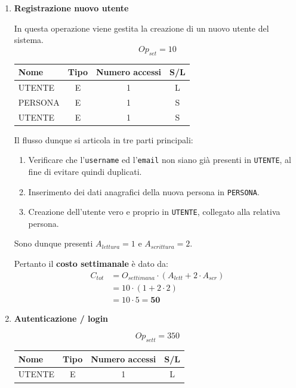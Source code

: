 \documentclass[a4paper,12pt]{report}
\begin{document}
\begin{enumerate}
	\item {\large \textbf{Registrazione nuovo utente}} \label{op1}
	
	In questa operazione viene gestita la creazione di un nuovo utente del sistema.
	$$
	{Op}_{set} = 10
	$$
	\begin{table}[H]
    \centering
    \small
    \renewcommand{\arraystretch}{1.15}
    \begin{tabularx}{0.8\textwidth}{|X|c|c|c|}
        \hline
        \rowcolor{gray!20}
        \textbf{Nome} & \textbf{Tipo} & \textbf{Numero accessi} & \textbf{S/L} \\
        \hline
        UTENTE & E & 1 & L \\
        \hline
        PERSONA & E & 1 & S \\
        \hline
        UTENTE & E & 1 & S \\
        \hline
    \end{tabularx}
	\end{table}

	Il flusso dunque si articola in tre parti principali:
	\begin{enumerate}
	\item Verificare che l'\texttt{username} ed l'\texttt{email} non siano già presenti in \texttt{UTENTE}, al fine di evitare quindi duplicati.
	\item Inserimento dei dati anagrafici della nuova persona in \texttt{PERSONA}.
	\item Creazione dell'utente vero e proprio in \texttt{UTENTE}, collegato alla relativa persona.
	\end{enumerate}

	Sono dunque presenti $A_{lettura}=1$ e $A_{scrittura}=2$.
	
	Pertanto il \textbf{costo settimanale} è dato da:
	\begin{align*}
	C_{tot} &= O_{settimana} \cdot (A_{lett} + 2 \cdot A_{scr}) \\
			&= 10 \cdot (1 + 2 \cdot 2) \\
			&= 10 \cdot 5 = \mathbf{50}
	\end{align*}
	

	\item {\large \textbf{Autenticazione / login}} \label{op2}
    
    $$
	{Op}_{sett} = 350
	$$
    
	\begin{table}[H]
    \centering
    \small
    \renewcommand{\arraystretch}{1.15}
    \begin{tabularx}{0.8\textwidth}{|X|c|c|c|}
        \hline
        \rowcolor{gray!20}
        \textbf{Nome} & \textbf{Tipo} & \textbf{Numero accessi} & \textbf{S/L} \\
        \hline
        UTENTE & E & 1 & L \\
        \hline
    \end{tabularx}
	\end{table}
    

\end{enumerate}
\end{document}
